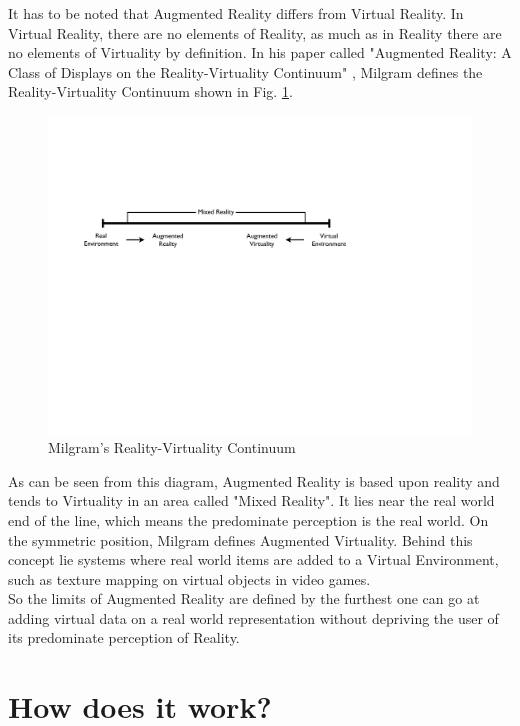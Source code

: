 It has to be noted that Augmented Reality differs from Virtual Reality. In Virtual Reality, there are no elements of Reality, as much as in Reality there are no elements of Virtuality by definition. In his paper called "Augmented Reality: A Class of Displays on the Reality-Virtuality Continuum" \cite{Mil94}, Milgram defines the Reality-Virtuality Continuum shown in Fig. \ref{fig:milgram_diagram}.

\begin{figure}[ht]
\center
\includegraphics[scale=0.5]{pics/milgram_diagram}
\caption{Milgram's Reality-Virtuality Continuum \cite{Mil94}}
\label{fig:milgram_diagram}
\end{figure}

As can be seen from this diagram, Augmented Reality is based upon reality and tends to Virtuality in an area called "Mixed Reality". It lies near the real world end of the line, which means the predominate perception is the real world. On the symmetric position, Milgram defines Augmented Virtuality. Behind this concept lie systems where real world items are added to a Virtual Environment, such as texture mapping on virtual objects in video games.\\

So the limits of Augmented Reality are defined by the furthest one can go at adding virtual data on a real world representation without depriving the user of its predominate perception of Reality.

\section{How does it work?}
\label{sec:how_does_ar_work}

